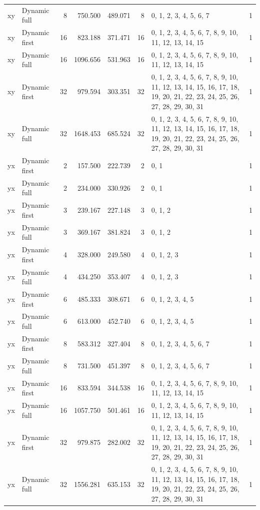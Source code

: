 \documentclass[10pt,a4paper]{article}
\begin{document}
\begin{longtable}{@{}p{23mm}p{29mm}rrrrp{36mm}r@{}}
xy & Dynamic full & 8 & 750.500 & 489.071 & 8 & 0, 1, 2, 3, 4, 5, 6, 7 & 1 \\
xy & Dynamic first & 16 & 823.188 & 371.471 & 16 & 0, 1, 2, 3, 4, 5, 6, 7, 8, 9, 10, 11, 12, 13, 14, 15 & 1 \\
xy & Dynamic full & 16 & 1096.656 & 531.963 & 16 & 0, 1, 2, 3, 4, 5, 6, 7, 8, 9, 10, 11, 12, 13, 14, 15 & 1 \\
xy & Dynamic first & 32 & 979.594 & 303.351 & 32 & 0, 1, 2, 3, 4, 5, 6, 7, 8, 9, 10, 11, 12, 13, 14, 15, 16, 17, 18, 19, 20, 21, 22, 23, 24, 25, 26, 27, 28, 29, 30, 31 & 1 \\
xy & Dynamic full & 32 & 1648.453 & 685.524 & 32 & 0, 1, 2, 3, 4, 5, 6, 7, 8, 9, 10, 11, 12, 13, 14, 15, 16, 17, 18, 19, 20, 21, 22, 23, 24, 25, 26, 27, 28, 29, 30, 31 & 1 \\
yx & Dynamic first & 2 & 157.500 & 222.739 & 2 & 0, 1 & 1 \\
yx & Dynamic full & 2 & 234.000 & 330.926 & 2 & 0, 1 & 1 \\
yx & Dynamic first & 3 & 239.167 & 227.148 & 3 & 0, 1, 2 & 1 \\
yx & Dynamic full & 3 & 369.167 & 381.824 & 3 & 0, 1, 2 & 1 \\
yx & Dynamic first & 4 & 328.000 & 249.580 & 4 & 0, 1, 2, 3 & 1 \\
yx & Dynamic full & 4 & 434.250 & 353.407 & 4 & 0, 1, 2, 3 & 1 \\
yx & Dynamic first & 6 & 485.333 & 308.671 & 6 & 0, 1, 2, 3, 4, 5 & 1 \\
yx & Dynamic full & 6 & 613.000 & 452.740 & 6 & 0, 1, 2, 3, 4, 5 & 1 \\
yx & Dynamic first & 8 & 583.312 & 327.404 & 8 & 0, 1, 2, 3, 4, 5, 6, 7 & 1 \\
yx & Dynamic full & 8 & 731.500 & 451.397 & 8 & 0, 1, 2, 3, 4, 5, 6, 7 & 1 \\
yx & Dynamic first & 16 & 833.594 & 344.538 & 16 & 0, 1, 2, 3, 4, 5, 6, 7, 8, 9, 10, 11, 12, 13, 14, 15 & 1 \\
yx & Dynamic full & 16 & 1057.750 & 501.461 & 16 & 0, 1, 2, 3, 4, 5, 6, 7, 8, 9, 10, 11, 12, 13, 14, 15 & 1 \\
yx & Dynamic first & 32 & 979.875 & 282.002 & 32 & 0, 1, 2, 3, 4, 5, 6, 7, 8, 9, 10, 11, 12, 13, 14, 15, 16, 17, 18, 19, 20, 21, 22, 23, 24, 25, 26, 27, 28, 29, 30, 31 & 1 \\
yx & Dynamic full & 32 & 1556.281 & 635.153 & 32 & 0, 1, 2, 3, 4, 5, 6, 7, 8, 9, 10, 11, 12, 13, 14, 15, 16, 17, 18, 19, 20, 21, 22, 23, 24, 25, 26, 27, 28, 29, 30, 31 & 1 \\
\end{longtable}\normalsize\setlength{\tabcolsep}{6pt}
\clearpage
\end{document}
